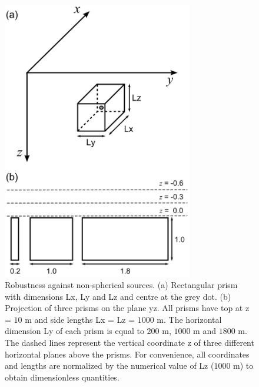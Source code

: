 \documentclass[journal abbreviation, npg]{copernicus}
\begin{document}
\begin{figure}[t]
\vspace*{2mm}
\begin{center}
\includegraphics[width=8.3cm]{Figures/Fig4.png}
\end{center}
\caption{Robustness against non-spherical sources. (a) Rectangular prism with dimensions Lx, Ly and Lz and centre at the grey dot. (b) Projection of three prisms on the plane yz. All prisms have top at z = $10$ m and side lengths Lx = Lz = $1000$ m. The horizontal dimension Ly of each prism is equal to $200$ m, $1000$ m and $1800$ m. The dashed lines represent the vertical coordinate z of three different horizontal planes above the prisms. For convenience, all coordinates and lengths are normalized by the numerical value of Lz ($1000$ m) to obtain dimensionless quantities.}
\label{fig:robust-shape-methodology}
\end{figure}
\end{document}
